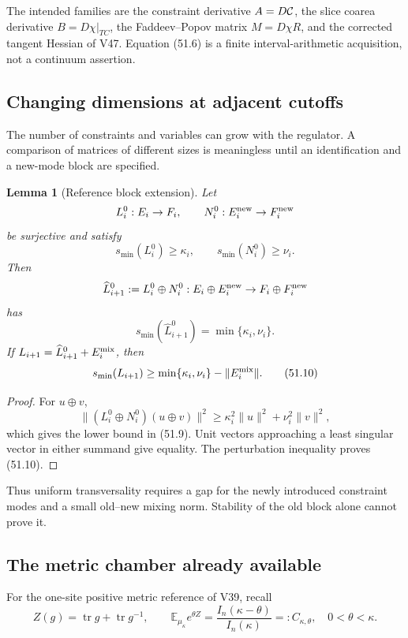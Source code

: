 \documentclass[11pt]{article}
\newtheorem{lemma}[theorem]{Lemma}
\begin{document}
The intended families are the constraint derivative \(A=D{\cal C}\),
the slice coarea derivative \(B=D\chi|_{TC}\), the Faddeev--Popov
matrix \(M=D\chi R\), and the corrected tangent Hessian of V47.
Equation (51.6) is a finite interval-arithmetic acquisition, not a
continuum assertion.

\subsection{Changing dimensions at adjacent cutoffs}

The number of constraints and variables can grow with the regulator.
A comparison of matrices of different sizes is meaningless until an
identification and a new-mode block are specified.

\begin{lemma}[Reference block extension]
\label{lem:v11v51-block}
Let
\[
 L_i^0:E_i\to F_i,\qquad N_i^0:E_i^{\rm new}\to F_i^{\rm new}
\]
be surjective and satisfy
\[
 s_{\min}(L_i^0)\ge\kappa_i,\qquad
 s_{\min}(N_i^0)\ge\nu_i.                                    \tag{51.8}
\]
Then
\[
 \widehat L_{i+1}^0
 :=L_i^0\oplus N_i^0:
 E_i\oplus E_i^{\rm new}\to F_i\oplus F_i^{\rm new}
\]
has
\[
                s_{\min}(\widehat L_{i+1}^0)
                    =\min\{\kappa_i,\nu_i\}.                  \tag{51.9}
\]
If
\(L_{i+1}=\widehat L_{i+1}^0+E_i^{\rm mix}\), then
\[
 s_{\min}(L_{i+1})
 \ge\min\{\kappa_i,\nu_i\}-\lVert E_i^{\rm mix}\rVert.        \tag{51.10}
\]
\end{lemma}

\begin{proof}
For \(u\oplus v\),
\[
 \lVert(L_i^0\oplus N_i^0)(u\oplus v)\rVert^2
 \ge\kappa_i^2\lVert u\rVert^2+\nu_i^2\lVert v\rVert^2,
\]
which gives the lower bound in (51.9).  Unit vectors approaching a
least singular vector in either summand give equality.  The
perturbation inequality proves (51.10).
\end{proof}

Thus uniform transversality requires a gap for the newly introduced
constraint modes and a small old--new mixing norm.  Stability of the
old block alone cannot prove it.

\subsection{The metric chamber already available}

For the one-site positive metric reference of V39, recall
\[
 Z(g)=\operatorname{tr}g+\operatorname{tr}g^{-1},\qquad
 {\mathbb E}_{\mu_\kappa}e^{\theta Z}
 =\frac{I_n(\kappa-\theta)}{I_n(\kappa)}
 =:C_{\kappa,\theta},\quad0<\theta<\kappa.                   \tag{51.11}
\]
\end{document}
